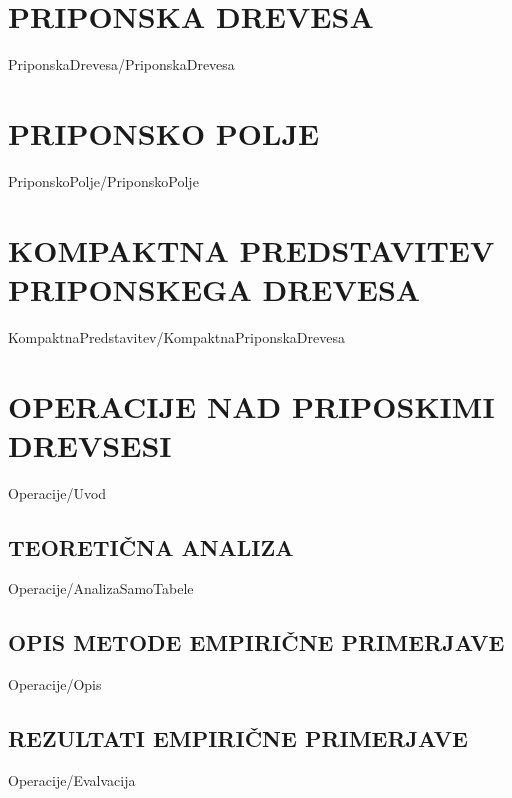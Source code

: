 \documentclass[12pt,a4paper,titlepage,openany,twoside]{report}
\begin{document}
\chapter{PRIPONSKA DREVESA}\label{sec:priponska_drevesa}
\thispagestyle{fancy} 
{PriponskaDrevesa/PriponskaDrevesa}

\chapter{PRIPONSKO POLJE}\label{sec:SA}
{PriponskoPolje/PriponskoPolje}

\chapter{KOMPAKTNA PREDSTAVITEV PRIPONSKEGA DREVESA}\label{sec:Kompaktna}
\thispagestyle{fancy} 


{KompaktnaPredstavitev/KompaktnaPriponskaDrevesa}

\chapter{OPERACIJE NAD PRIPOSKIMI DREVSESI}\label{sec:OPeracije}
\thispagestyle{fancy} 
{Operacije/Uvod}



\section{TEORETIČNA ANALIZA}\label{sec:analiza}
{Operacije/AnalizaSamoTabele}


\section{OPIS METODE EMPIRIČNE PRIMERJAVE}\label{sec:opis}
{Operacije/Opis}


\section{REZULTATI EMPIRIČNE PRIMERJAVE}\label{sec:primerjava}
{Operacije/Evalvacija}
\end{document}
